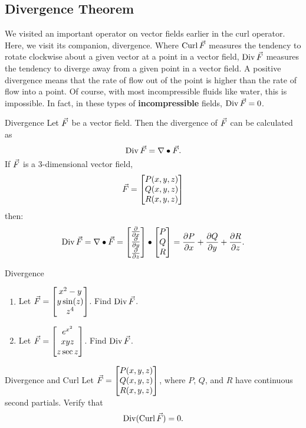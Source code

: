 \subsection{Divergence Theorem}
We visited an important operator on vector fields earlier in the curl operator. Here, we visit its companion, divergence. Where $\operatorname{Curl} \vec{F}$ measures the tendency to rotate clockwise about a given vector at a point in a vector field, $\operatorname{Div} \vec{F}$ measures the tendency to diverge away from a given point in a vector field. A positive divergence means that the rate of flow out of the point is higher than the rate of flow into a point. Of course, with most incompressible fluids like water, this is impossible. In fact, in these types of \textbf{incompressible} fields, $\operatorname{Div}\vec{F}=0$.

\begin{definition}{Divergence}
Let $\vec{F}$ be a vector field. Then the divergence of $\vec{F}$ can be calculated as
$$\operatorname{Div}\vec{F}=\nabla\bullet\vec{F}.$$
If $\vec{F}$ is a 3-dimensional vector field, $$\vec{F}=\begin{bmatrix}P(x,y,z)\\Q(x,y,z)\\R(x,y,z)\end{bmatrix} $$ then:
$$\operatorname{Div}\vec{F}=\nabla\bullet\vec{F}=\begin{bmatrix}\frac{\partial }{\partial x}\\ \frac{\partial }{\partial y} \\ \frac{\partial }{\partial z}\end{bmatrix}\bullet\begin{bmatrix}P\\Q\\R\end{bmatrix}=\frac{\partial P}{\partial x}+ \frac{\partial Q}{\partial y}+ \frac{\partial R}{\partial z} .$$
\end{definition}

\begin{exercise}{Divergence}
\begin{enumerate}
\item Let $\vec{F}=\begin{bmatrix}x^2-y\\y\sin(z)\\z^4\end{bmatrix}$. Find $\operatorname{Div}\vec{F}$.
\vspace{1em}
\item Let $\vec{F}=\begin{bmatrix}e^{x^2}\\xyz\\z\sec{z}\end{bmatrix}$. Find $\operatorname{Div}\vec{F}$.
\end{enumerate}
\end{exercise}

\begin{exercise}{Divergence and Curl}
Let $\vec{F}=\begin{bmatrix}P(x,y,z)\\Q(x,y,z)\\R(x,y,z)\end{bmatrix}$, where $P$, $Q$, and $R$ have continuous second partials. Verify that $$\operatorname{Div}(\operatorname{Curl}\vec{F})=0.$$
\end{exercise}

